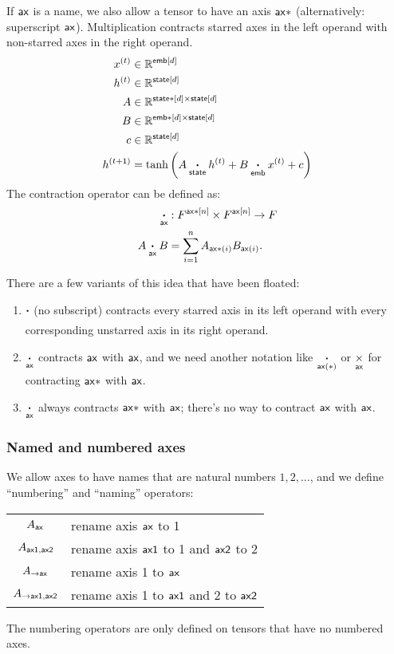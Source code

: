 If $\mathsf{ax}$ is a name, we also allow a tensor to have an axis $\mathsf{ax*}$ (alternatively: superscript $\mathsf{ax}$). Multiplication contracts starred axes in the left operand with non-starred axes in the right operand.
\begin{align*}
x^{(t)} &\in \mathbb{R}^{\mathsf{emb}[d]} \\
h^{(t)} &\in \mathbb{R}^{\mathsf{state}[d]} \\
A &\in \mathbb{R}^{\mathsf{state*}[d] \times \mathsf{state}[d]} \\
B &\in \mathbb{R}^{\mathsf{emb*}[d] \times \mathsf{state}[d]} \\
c &\in \mathbb{R}^{\mathsf{state}[d]} \\
h^{(t+1)} &= \tanh\left( A \mathbin{\mathop{\boldsymbol\cdot}\limits_{\mathsf{state}}} h^{(t)} + B \mathbin{\mathop{\boldsymbol\cdot}\limits_{\mathsf{emb}}} x^{(t)} + c \right) 
\end{align*}
The contraction operator can be defined as:
\begin{align*}
\mathbin{\mathop{\boldsymbol\cdot}\limits_{\mathsf{ax}}} &: F^{\mathsf{ax*}[n]} \times F^{\mathsf{ax}[n]} \rightarrow F \\
A \mathbin{\mathop{\boldsymbol\cdot}\limits_{\mathsf{ax}}} B &= \sum_{i=1}^n A_{\mathsf{ax*}(i)} B_{\mathsf{ax}(i)}.
\end{align*}

There are a few variants of this idea that have been floated:
\begin{enumerate}
\item $\mathbin{\mathop{\boldsymbol\cdot}\limits_{\mathsf{}}}$ (no subscript) contracts every starred axis in its left operand with every corresponding unstarred axis in its right operand.
\item $\mathbin{\mathop{\boldsymbol\cdot}\limits_{\mathsf{ax}}}$ contracts $\mathsf{ax}$ with $\mathsf{ax}$, and we need another notation like $\mathbin{\mathop{\boldsymbol\cdot}\limits_{\mathsf{ax(*)}}}$ or $\mathbin{\mathop{\times}\limits_{\mathsf{ax}}}$ for contracting $\mathsf{ax*}$ with $\mathsf{ax}$.
\item $\mathbin{\mathop{\boldsymbol\cdot}\limits_{\mathsf{ax}}}$ always contracts $\mathsf{ax*}$ with $\mathsf{ax}$; there's no way to contract $\mathsf{ax}$ with $\mathsf{ax}$.
\end{enumerate}

\subsubsection{Named and numbered axes}
\label{sec:tensorsoftensors}

We allow axes to have names that are natural numbers $1, 2, \ldots$, and we define ``numbering'' and ``naming'' operators:
\begin{center}
\begin{tabular}{cl}
$A_{\mathsf{ax}}$ & rename axis $\mathsf{ax}$ to 1 \\
$A_{\mathsf{ax1},\mathsf{ax2}}$ & rename axis $\mathsf{ax1}$ to 1 and $\mathsf{ax2}$ to 2 \\
$A_{\rightarrow\mathsf{ax}}$ & rename axis 1 to $\mathsf{ax}$ \\
$A_{\rightarrow\mathsf{ax1},\mathsf{ax2}}$ & rename axis 1 to $\mathsf{ax1}$ and 2 to $\mathsf{ax2}$
\end{tabular}
\end{center}
The numbering operators are only defined on tensors that have no numbered axes.

